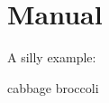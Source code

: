 \documentclass{report}
\begin{document}
\newcommand{\nestedhandler}[1]{%
  \glsxtrunsrtdo{#1}%
  \ifglossaryexists*{#1}%
  {%
    \printunsrtinnerglossary[type={#1},leveloffset=++1]{}{}%
  }%
  {}%
}

\printunsrtglossary*[type=main,style=index]{%
  \let\printunsrtglossaryhandler\nestedhandler
}

\chapter{Manual}

A silly example:
\begin{printunsrtglossarywrap}[style=indexgroup]
%
\xdef\glscurrententrylabel{cabbage}%
\printunsrtglossaryhandler\glscurrententrylabel
\glsgroupskip
{}%
\xdef\glscurrententrylabel{broccoli}%
\printunsrtglossaryhandler\glscurrententrylabel
\end{printunsrtglossarywrap}
\end{document}

